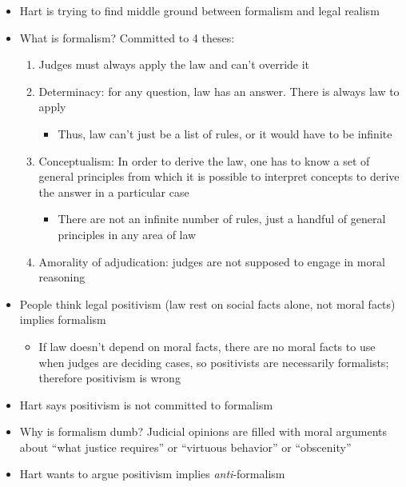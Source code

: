 \begin{itemize}
\tightlist
\item
  Hart is trying to find middle ground between formalism and legal
  realism
\item
  What is formalism? Committed to 4 theses:

  \begin{enumerate}
  \def\labelenumi{\arabic{enumi}.}
  \tightlist
  \item
    Judges must always apply the law and can't override it
  \item
    Determinacy: for any question, law has an answer. There is always
    law to apply

    \begin{itemize}
    \tightlist
    \item
      Thus, law can't just be a list of rules, or it would have to be
      infinite
    \end{itemize}
  \item
    Conceptualism: In order to derive the law, one has to know a set of
    general principles from which it is possible to interpret concepts
    to derive the answer in a particular case

    \begin{itemize}
    \tightlist
    \item
      There are not an infinite number of rules, just a handful of
      general principles in any area of law
    \end{itemize}
  \item
    Amorality of adjudication: judges are not supposed to engage in
    moral reasoning
  \end{enumerate}
\item
  People think legal positivism (law rest on social facts alone, not
  moral facts) implies formalism

  \begin{itemize}
  \tightlist
  \item
    If law doesn't depend on moral facts, there are no moral facts to
    use when judges are deciding cases, so positivists are necessarily
    formalists; therefore positivism is wrong
  \end{itemize}
\item
  Hart says positivism is not committed to formalism
\item
  Why is formalism dumb? Judicial opinions are filled with moral
  arguments about ``what justice requires'' or ``virtuous behavior'' or
  ``obscenity''
\item
  Hart wants to argue positivism implies \emph{anti}-formalism


\end{itemize}
